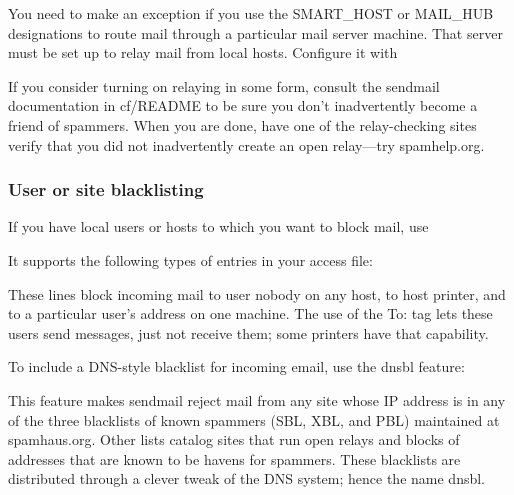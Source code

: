 You need to make an exception if you use the {SMART\_HOST} or
{MAIL\_HUB} designations to route mail through a particular mail server
machine. That server must be set up to relay mail from local hosts.
Configure it with


If you consider turning on relaying in some form, consult the {sendmail}
documentation in {cf/README} to be sure you don't inadvertently become a
friend of spammers. When you are done, have one of the relay-checking
sites verify that you did not inadvertently create an open relay---try
spamhelp.org.

\subsubsection[User or site
blacklisting]{\texorpdfstring{\protect\hypertarget{part0026_split_037.htmlux5cux23_idTextAnchor1094}{}{}\protect\hypertarget{part0026_split_037.htmlux5cux23_idTextAnchor1095}{}{}U\protect\hypertarget{part0026_split_037.htmlux5cux23_idTextAnchor1096}{}{}ser
or site blacklisting}{User or site blacklisting}}

\protect\hypertarget{part0026_split_037.htmlux5cux23_idIndexMarker2568}{}{}\protect\hypertarget{part0026_split_037.htmlux5cux23_idIndexMarker2569}{}{}\protect\hypertarget{part0026_split_037.htmlux5cux23_idIndexMarker2570}{}{}If
you have local users or hosts to which you want to block mail,
use\protect\hypertarget{part0026_split_037.htmlux5cux23_idIndexMarker2571}{}{}


It supports the following types of entries in your access file:


These lines block incoming mail to user nobody on any host, to host
printer, and to a particular user's address on one machine. The use of
the {To:} tag lets these users send messages, just not receive them;
some printers have that capability.

To include a DNS-style blacklist for incoming email, use the {dnsbl}
feature:


This feature makes {sendmail} reject mail from any site whose IP address
is in any of the three blacklists of known spammers (SBL, XBL, and PBL)
maintained at {spamhaus.org}. Other lists catalog sites that run open
relays and blocks of addresses that are known to be havens for spammers.
These blacklists are distributed through a clever tweak of the DNS
system; hence the name {dnsbl}.

